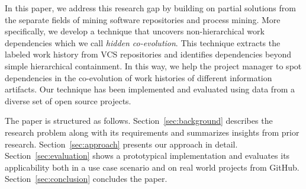 In this paper, we address this research gap by building on partial solutions from the separate fields of mining software repositories and process mining. More specifically, we develop a technique that uncovers non-hierarchical work dependencies which we call \emph{hidden co-evolution}. This technique extracts the labeled work history from VCS repositories and identifies dependencies beyond simple hierarchical containment. In this way, we help the project manager to spot dependencies in the co-evolution of work histories of different information artifacts. Our technique has been implemented and evaluated using data from a diverse set of open source projects.


The paper is structured as follows. Section~\ref{sec:background} describes the research problem along with its requirements and summarizes insights from prior research. Section~\ref{sec:approach} presents our approach in detail. Section~\ref{sec:evaluation} shows a prototypical implementation and evaluates its applicability both in a use case scenario and on real world projects from GitHub. Section~\ref{sec:conclusion} concludes the paper.


